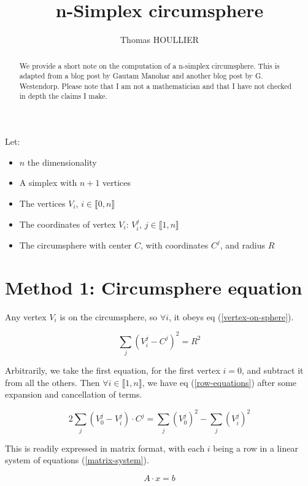 \documentclass[]{article}
\title{n-Simplex circumsphere}
\author{Thomas HOULLIER}
\begin{document}
\maketitle

\begin{abstract}
We provide a short note on the computation of a n-simplex circumsphere. This is
adapted from a blog post by Gautam Manohar and another blog post by G.
Westendorp. Please note that I am not a mathematician and that I have not
checked in depth the claims I make.
\end{abstract}

Let:
\begin{itemize}
\item $n$ the dimensionality
\item A simplex with $n+1$ vertices
\item The vertices $V_i$, $i\in \llbracket 0, n \rrbracket$
\item The coordinates of vertex $V_i$: $V_i^j$, $j\in\llbracket 1, n \rrbracket$
\item The circumsphere with center $C$, with coordinates $C^j$, and radius $R$
\end{itemize}

\section{Method 1: Circumsphere equation}
Any vertex $V_i$ is on the circumsphere, so $\forall i$, it obeys eq
(\ref{vertex-on-sphere}).

\begin{equation} \label{vertex-on-sphere}
\sum_j \left( V_i^j - C^j \right)^2 = R^2
\end{equation}

Arbitrarily, we take the first equation, for the first vertex $i=0$, and
subtract it from all the others. Then $\forall i \in \llbracket 1, n
\rrbracket$, we have eq (\ref{row-equations}) after some expansion and
cancellation of terms.

\begin{equation} \label{row-equations}
2 \sum_j \left( V_0^j - V_i^j \right) \cdot C^j =
  \sum_j \left( V_0^j \right)^2 - \sum_j \left( V_i^j \right)^2
\end{equation}

This is readily expressed in matrix format, with each $i$ being a row
in a linear system of equations (\ref{matrix-system}).

\begin{equation} \label{matrix-system}
A \cdot x = b
\end{equation}
\end{document}
